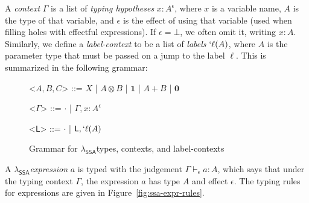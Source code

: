\documentclass[acmsmall,screen,review]{acmart}
\newcommand{\ms}[1]{\ensuremath{\mathsf{#1}}}
\newcommand{\lbl}[1]{{`#1}}
\newcommand{\thyp}[3]{#1 : {#2}^{#3}}
\newcommand{\bhyp}[2]{#1 : #2}
\newcommand{\lhyp}[2]{#1(#2)}
\newcommand{\llhyp}[2]{\lhyp{\lbl{#1}}{#2}}
\newcommand{\hasty}[4]{#1 \vdash_{#2} #3: {#4}}
\newcommand{\isotopessa}{\(\lambda_{\ms{SSA}}\)}
\begin{document}
A \textit{context} $\Gamma$ is a list of \textit{typing hypotheses} $\thyp{x}{A}{\epsilon}$, where
$x$ is a variable name, $A$ is the type of that variable, and $\epsilon$ is the effect of using that
variable (used when filling holes with effectful expressions). If $\epsilon = \bot$, we often omit
it, writing $\bhyp{x}{A}$. Similarly, we define a \textit{label-context} to be a list of
\textit{labels} $\llhyp{\ell}{A}$, where $A$ is the parameter type that must be passed on a jump to
the label $\ell$. This is summarized in the following grammar:

\begin{figure}[H]
  \begin{center}
    \begin{minipage}{.5\textwidth}
      \begin{grammar}
        <\(A, B, C\)> ::= 
        \(X\)
        \;|\; \(A \otimes B\)
        \;|\; \(\mathbf{1}\)
        \;|\; \(A + B\)
        \;|\; \(\mathbf{0}\)
      \end{grammar}
    \end{minipage}%
    \begin{minipage}{.25\textwidth}
      \begin{grammar}
        <\(\Gamma\)> ::= \(\cdot\) \;|\; \(\Gamma, \thyp{x}{A}{\epsilon}\)
      \end{grammar}
    \end{minipage}%
    \begin{minipage}{.25\textwidth}
      \begin{grammar}
        <\(\ms{L}\)> ::= \(\cdot\) \;|\; \(\ms{L}, \llhyp{\ell}{A}\)
      \end{grammar}
    \end{minipage}
  \end{center}
  \caption{Grammar for \isotopessa types, contexts, and label-contexts}
  \label{fig:ssa-ty-grammar}
  \Description{}
\end{figure}

A \isotopessa \textit{expression} $a$ is typed with the judgement $\hasty{\Gamma}{\epsilon}{a}{A}$,
which says that under the typing context $\Gamma$, the expression $a$ has type $A$ and effect
$\epsilon$. The typing rules for expressions are given in Figure~\ref{fig:ssa-expr-rules}.
\end{document}
